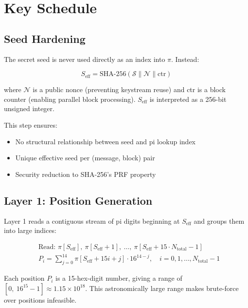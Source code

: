 \documentclass[12pt, a4paper]{article}
\newcommand{\seed}{\mathcal{S}}
\begin{document}
\section{Key Schedule}

\subsection{Seed Hardening}

The secret seed is never used directly as an index into $\pi$. Instead:

\begin{equation}
  S_{\text{eff}} = \text{SHA-256}(\seed \| \mathcal{N} \| \text{ctr})
\end{equation}

where $\mathcal{N}$ is a public nonce (preventing keystream reuse) and ctr is a block counter (enabling parallel block processing). $S_{\text{eff}}$ is interpreted as a 256-bit unsigned integer.

This step ensures:
\begin{itemize}
  \item No structural relationship between seed and pi lookup index
  \item Unique effective seed per (message, block) pair
  \item Security reduction to SHA-256's PRF property
\end{itemize}

\subsection{Layer 1: Position Generation}

Layer 1 reads a contiguous stream of pi digits beginning at $S_{\text{eff}}$ and groups them into large indices:

\begin{align}
  &\text{Read: } \pi[S_{\text{eff}}],\ \pi[S_{\text{eff}}+1],\ \ldots,\ \pi[S_{\text{eff}} + 15 \cdot N_{\text{total}} - 1] \nonumber\\
  &P_i = \sum_{j=0}^{14} \pi[S_{\text{eff}} + 15i + j] \cdot 16^{14-j}, \quad i = 0, 1, \ldots, N_{\text{total}}-1
\end{align}

Each position $P_i$ is a 15-hex-digit number, giving a range of $[0,\ 16^{15} - 1] \approx 1.15 \times 10^{18}$. This astronomically large range makes brute-force over positions infeasible.
\end{document}

